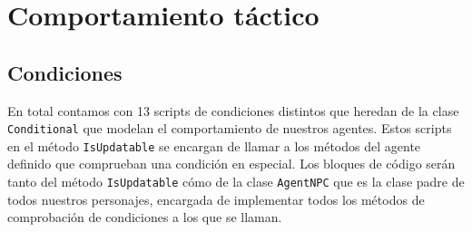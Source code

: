 \section{Comportamiento táctico}


\subsection{Condiciones}

En total contamos con 13 scripts de condiciones distintos que heredan de la clase \texttt{Conditional} que modelan el comportamiento de nuestros agentes. Estos scripts en el método \texttt{IsUpdatable} se encargan de llamar a los métodos del agente definido que comprueban una condición en especial. Los bloques de código serán tanto del método \texttt{IsUpdatable} cómo de la clase \texttt{AgentNPC} que es la clase padre de todos nuestros personajes, encargada de implementar todos los métodos de comprobación de condiciones a los que se llaman. 

